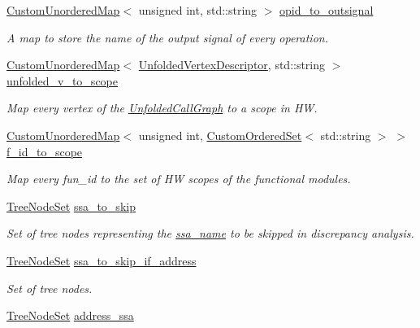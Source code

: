 \begin{DoxyCompactItemize}
\hyperlink{custom__map_8hpp_ad1ed68f2ff093683ab1a33522b144adc}{Custom\+Unordered\+Map}$<$ unsigned int, std\+::string $>$ \hyperlink{structDiscrepancy_a67ee727c44bf0c2e7e5995d67e7099d3}{opid\+\_\+to\+\_\+outsignal}
\begin{DoxyCompactList}\small\item\em A map to store the name of the output signal of every operation. \end{DoxyCompactList}\item 
\hyperlink{custom__map_8hpp_ad1ed68f2ff093683ab1a33522b144adc}{Custom\+Unordered\+Map}$<$ \hyperlink{UnfoldedCallGraph_8hpp_a6c87395c9d950d587c8e4db39b93e3e2}{Unfolded\+Vertex\+Descriptor}, std\+::string $>$ \hyperlink{structDiscrepancy_aa61fa1c5f2ec0207409fbf6147e5f6a2}{unfolded\+\_\+v\+\_\+to\+\_\+scope}
\begin{DoxyCompactList}\small\item\em Map every vertex of the \hyperlink{classUnfoldedCallGraph}{Unfolded\+Call\+Graph} to a scope in HW. \end{DoxyCompactList}\item 
\hyperlink{custom__map_8hpp_ad1ed68f2ff093683ab1a33522b144adc}{Custom\+Unordered\+Map}$<$ unsigned int, \hyperlink{classCustomOrderedSet}{Custom\+Ordered\+Set}$<$ std\+::string $>$ $>$ \hyperlink{structDiscrepancy_a4f56a1d98d80c8f3294e01c5c2c1cc85}{f\+\_\+id\+\_\+to\+\_\+scope}
\begin{DoxyCompactList}\small\item\em Map every fun\+\_\+id to the set of HW scopes of the functional modules. \end{DoxyCompactList}\item 
\hyperlink{classTreeNodeSet}{Tree\+Node\+Set} \hyperlink{structDiscrepancy_a948b9a53adc3a65cda0046eb6c5e516a}{ssa\+\_\+to\+\_\+skip}
\begin{DoxyCompactList}\small\item\em Set of tree nodes representing the \hyperlink{structssa__name}{ssa\+\_\+name} to be skipped in discrepancy analysis. \end{DoxyCompactList}\item 
\hyperlink{classTreeNodeSet}{Tree\+Node\+Set} \hyperlink{structDiscrepancy_a9c2015c8e6d41e5ff0ec2b713527f132}{ssa\+\_\+to\+\_\+skip\+\_\+if\+\_\+address}
\begin{DoxyCompactList}\small\item\em Set of tree nodes. \end{DoxyCompactList}\item 
\hyperlink{classTreeNodeSet}{Tree\+Node\+Set} \hyperlink{structDiscrepancy_aefe1a7cac365946d3357a5e9c771506e}{address\+\_\+ssa}

\end{DoxyCompactItemize}
